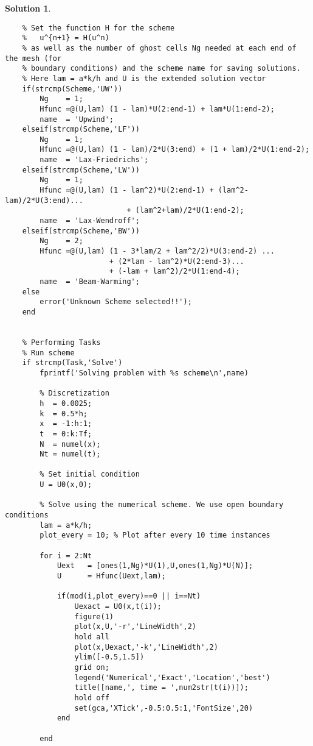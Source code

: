 \documentclass[10pt,letterpaper]{article}
\theoremstyle{break}
\newtheorem{solution}{Solution}
\begin{document}
\begin{solution}
\begin{lstlisting}
    % Set the function H for the scheme
    %   u^{n+1} = H(u^n)
    % as well as the number of ghost cells Ng needed at each end of the mesh (for
    % boundary conditions) and the scheme name for saving solutions.
    % Here lam = a*k/h and U is the extended solution vector
    if(strcmp(Scheme,'UW'))
        Ng    = 1;
        Hfunc =@(U,lam) (1 - lam)*U(2:end-1) + lam*U(1:end-2);
        name  = 'Upwind';
    elseif(strcmp(Scheme,'LF'))
        Ng    = 1;
        Hfunc =@(U,lam) (1 - lam)/2*U(3:end) + (1 + lam)/2*U(1:end-2);
        name  = 'Lax-Friedrichs';
    elseif(strcmp(Scheme,'LW'))
        Ng    = 1;
        Hfunc =@(U,lam) (1 - lam^2)*U(2:end-1) + (lam^2-lam)/2*U(3:end)...
                            + (lam^2+lam)/2*U(1:end-2);
        name  = 'Lax-Wendroff';
    elseif(strcmp(Scheme,'BW'))
        Ng    = 2;
        Hfunc =@(U,lam) (1 - 3*lam/2 + lam^2/2)*U(3:end-2) ...
                        + (2*lam - lam^2)*U(2:end-3)...
                        + (-lam + lam^2)/2*U(1:end-4);
        name  = 'Beam-Warming';
    else
        error('Unknown Scheme selected!!');
    end
    
    
    % Performing Tasks
    % Run scheme
    if strcmp(Task,'Solve')
        fprintf('Solving problem with %s scheme\n',name)
        
        % Discretization
        h  = 0.0025;
        k  = 0.5*h;
        x  = -1:h:1;
        t  = 0:k:Tf;
        N  = numel(x);
        Nt = numel(t);
        
        % Set initial condition
        U = U0(x,0);
        
        % Solve using the numerical scheme. We use open boundary conditions
        lam = a*k/h;
        plot_every = 10; % Plot after every 10 time instances
        
        for i = 2:Nt
            Uext   = [ones(1,Ng)*U(1),U,ones(1,Ng)*U(N)];
            U      = Hfunc(Uext,lam);
            
            if(mod(i,plot_every)==0 || i==Nt)
                Uexact = U0(x,t(i));
                figure(1)
                plot(x,U,'-r','LineWidth',2)
                hold all
                plot(x,Uexact,'-k','LineWidth',2)
                ylim([-0.5,1.5])
                grid on;
                legend('Numerical','Exact','Location','best')
                title([name,', time = ',num2str(t(i))]);
                hold off
                set(gca,'XTick',-0.5:0.5:1,'FontSize',20)
            end
            
        end
        

\end{lstlisting}
\end{solution}
\end{document}
